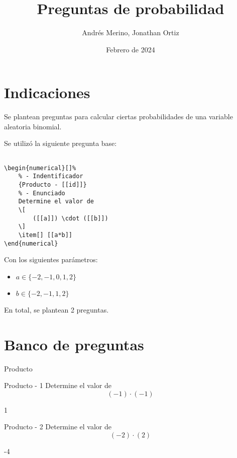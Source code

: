 \documentclass[a4,11pt]{article}
\title{Preguntas de probabilidad}
\author{Andrés Merino, Jonathan Ortiz}
\date{Febrero de 2024}
\begin{document}
\maketitle

\section{Indicaciones}

Se plantean preguntas para calcular ciertas probabilidades de una variable aleatoria binomial.



Se utilizó la siguiente pregunta base:
\begin{lstlisting}[breaklines]

\begin{numerical}[]%
    % - Indentificador
    {Producto - [[id]]}
    % - Enunciado
    Determine el valor de
    \[
        ([[a]]) \cdot ([[b]])
    \]
    \item[] [[a*b]]
\end{numerical}

\end{lstlisting}
\noindent
Con los siguientes parámetros:
\begin{itemize}
	\item $a \in \{-2, -1, 0, 1, 2\}$
	\item $b \in \{-2, -1, 1, 2\}$

\end{itemize}
En total, se plantean 2 preguntas.


\section{Banco de preguntas}

\begin{quiz}{Producto}

\begin{numerical}[]%
    {Producto - 1}
    Determine el valor de
    \[
        (-1) \cdot (-1)
    \]
    \item[] 1
\end{numerical}

\begin{numerical}[]%
    {Producto - 2}
    Determine el valor de
    \[
        (-2) \cdot (2)
    \]
    \item[] -4
\end{numerical}




\end{quiz}
\end{document}
